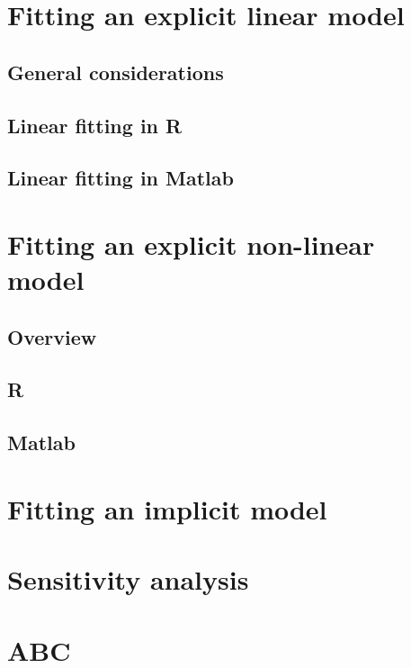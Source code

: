 \documentclass[a4paper,11pt]{article}
\begin{document}
\section{Fitting an explicit linear model}\label{linear}
\subsection{General considerations}
\subsection{Linear fitting in R}
\subsection{Linear fitting in Matlab}

\section{Fitting an explicit non-linear model}\label{nonlinear}
\subsection{Overview}
\subsection{R}
\subsection{Matlab}

\section{Fitting an implicit model}\label{implicit}
\section{Sensitivity analysis}\label{sensitivity}
\section{ABC}\label{abc}




\end{document}
